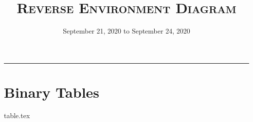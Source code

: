 \documentclass{exam}
\title{\textsc{Reverse Environment Diagram}}
\date{September 21, 2020 to September 24, 2020}
\begin{document}
\maketitle
\rule{\textwidth}{0.15em}
\fontsize{12}{15}\selectfont

\section{Binary Tables}
\begin{questions}
{table.tex}
\end{questions}
\end{document}
